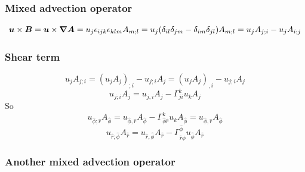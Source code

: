 \documentclass[\mydriver,12pt,twoside,notitlepage,a4paper]{article}
\renewcommand{\vec}[1]{\mbox{\boldmath{$#1$}}}
\newcommand{\Av}            {\vec{A}}
\newcommand{\Bv}            {\vec{B}}
\newcommand{\uv}            {\vec{u}}
\newcommand{\nab}{\mbox{\boldmath $\nabla$} {}}
\begin{document}
\subsubsection{Mixed advection operator}

\begin{equation}
\uv\times\Bv=\uv\times\nab\Av
=u_j\epsilon_{ijk}\epsilon_{klm}A_{m;l}
=u_j(\delta_{il}\delta_{jm}-\delta_{im}\delta_{jl})A_{m;l}
=u_jA_{j;i}-u_jA_{i;j}
\end{equation}

\subsubsection{Shear term}

\begin{equation}
u_jA_{j;i}
=(u_jA_j)_{;i}-u_{j;i}A_j
=(u_jA_j)_{,i}-u_{j;i}A_j
\end{equation}
\begin{equation}
u_{j;i}A_j=u_{j,i}A_j-\Gamma^k_{ji}u_kA_j
\end{equation}
So
\begin{equation}
u_{\hat\phi;\hat r}A_{\hat\phi}
=u_{\hat\phi,\hat r}A_{\hat\phi}
-\Gamma^k_{\hat\phi\hat r}u_kA_{\hat\phi}
=u_{\hat\phi,\hat r}A_{\hat\phi}
\end{equation}
\begin{equation}
u_{\hat r;\hat\phi}A_{\hat r}
=u_{\hat r,\hat\phi}A_{\hat r}
-\Gamma^{\hat\phi}_{\hat r\hat\phi}u_{\hat\phi}A_{\hat r}
\end{equation}

\subsubsection{Another mixed advection operator}
\end{document}
